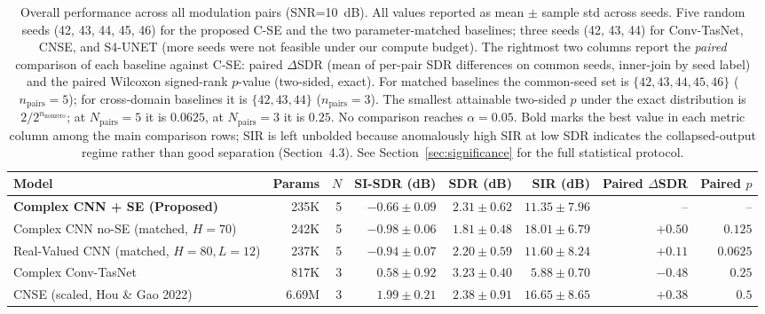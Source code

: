 \documentclass[twocolumn,english]{svjour3}
\begin{document}
\begin{table}[t]
    \centering
    \caption{Overall performance across all modulation pairs (SNR=\SI{10}{dB}). All values reported as mean $\pm$ sample std across seeds. Five random seeds (42, 43, 44, 45, 46) for the proposed C-SE and the two parameter-matched baselines; three seeds (42, 43, 44) for Conv-TasNet, CNSE, and S4-UNET (more seeds were not feasible under our compute budget). The rightmost two columns report the \emph{paired} comparison of each baseline against C-SE: paired $\Delta$SDR (mean of per-pair SDR differences on common seeds, inner-join by seed label) and the paired Wilcoxon signed-rank $p$-value (two-sided, exact). For matched baselines the common-seed set is $\{42,43,44,45,46\}$ ($n_{\text{pairs}}{=}5$); for cross-domain baselines it is $\{42,43,44\}$ ($n_{\text{pairs}}{=}3$). The smallest attainable two-sided $p$ under the exact distribution is $2/2^{n_{\text{nonzero}}}$; at $N_{\text{pairs}}{=}5$ it is $0.0625$, at $N_{\text{pairs}}{=}3$ it is $0.25$. No comparison reaches $\alpha=0.05$. Bold marks the best value in each metric column among the main comparison rows; SIR is left unbolded because anomalously high SIR at low SDR indicates the collapsed-output regime rather than good separation (Section~4.3). See Section~\ref{sec:significance} for the full statistical protocol.}
    \label{tab:overall}
    \footnotesize
    \setlength{\tabcolsep}{4pt}
    \begin{tabular}{lrrrrrrr}
        \toprule
        Model & Params & $N$ & SI-SDR (dB) & SDR (dB) & SIR (dB) & Paired $\Delta$SDR & Paired $p$ \\
        \midrule
        \textbf{Complex CNN + SE (Proposed)}         & 235K  & 5 & $-0.66 \pm 0.09$ & $2.31 \pm 0.62$              & $11.35 \pm 7.96$ & -- & -- \\
        Complex CNN no-SE (matched, $H{=}70$)       & 242K  & 5 & $-0.98 \pm 0.06$ & $1.81 \pm 0.48$              & $18.01 \pm 6.79$ & $+0.50$ & $0.125$ \\
        Real-Valued CNN (matched, $H{=}80,L{=}12$)  & 237K  & 5 & $-0.94 \pm 0.07$ & $2.20 \pm 0.59$              & $11.60 \pm 8.24$ & $+0.11$ & $0.0625$ \\
        Complex Conv-TasNet                        & 817K  & 3 & $0.58 \pm 0.92$          & $3.23 \pm 0.40$    & $5.88 \pm 0.70$ & $-0.48$ & $0.25$ \\
        CNSE (scaled, Hou \& Gao 2022)             & 6.69M  & 3 & $\mathbf{1.99 \pm 0.21}$ & $2.38 \pm 0.91$    & $16.65 \pm 8.65$ & $+0.38$ & $0.5$ \\

\end{tabular}
\end{table}
\end{document}
